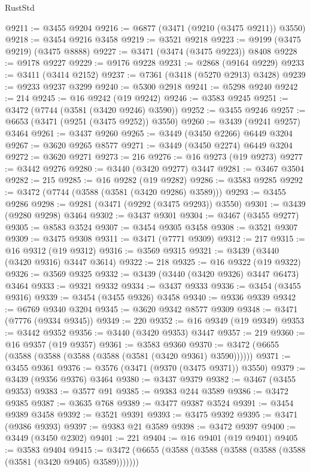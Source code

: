 \begin{lexlean}{RustStd}
\begin{coremodule}
{{{{{{{{{{{{{{{{{{{@9211 := @3455 @9204
@9216 := @6877 (@3471 (@9210 (@3475 @9211)) @3550)
@9218 := @3454 @9216 @3458
@9219 := @3521 @9218
@9223 := @9199 (@3475 @9219) (@3475 @8888)
@9227 := @3471 (@3474 (@3475 @9223)) @8408
@9228 := @9178 @9227
@9229 := @9176 @9228
@9231 := @2868 (@9164 @9229)
@9233 := @3411 (@3414 @2152)
@9237 := @7361 (@3418 (@5270 @2913) @3428)
@9239 := @9233 @9237 @3299
@9240 := @5300 @2918
@9241 := @5298 @9240
@9242 := 214
@9245 := @16 @9242 (@19 @9242)
@9246 := @3583 @9245
@9251 := @3472 (@7744 (@3581 (@3420 @9246) @3590))
@9252 := @3455 @9246
@9257 := @6653 (@3471 (@9251 (@3475 @9252)) @3550)
@9260 := @3439 (@9241 @9257) @3464
@9261 := @3437 @9260
@9265 := @3449 (@3450 @2266) @6449 @3204
@9267 := @3620 @9265 @8577
@9271 := @3449 (@3450 @2274) @6449 @3204
@9272 := @3620 @9271
@9273 := 216
@9276 := @16 @9273 (@19 @9273)
@9277 := @3442 @9276
@9280 := @3440 (@3420 @9277) @3447
@9281 := @3467 @3504
@9282 := 215
@9285 := @16 @9282 (@19 @9282)
@9286 := @3583 @9285
@9292 := @3472 (@7744 (@3588 (@3581 (@3420 @9286) @3589)))
@9293 := @3455 @9286
@9298 := @9281 (@3471 (@9292 (@3475 @9293)) @3550)
@9301 := @3439 (@9280 @9298) @3464
@9302 := @3437 @9301
@9304 := @3467 (@3455 @9277)
@9305 := @8583 @3524
@9307 := @3454 @9305 @3458
@9308 := @3521 @9307
@9309 := @3475 @9308
@9311 := @3471 (@7771 @9309)
@9312 := 217
@9315 := @16 @9312 (@19 @9312)
@9316 := @3569 @9315
@9321 := @3439 (@3440 (@3420 @9316) @3447 @3614)
@9322 := 218
@9325 := @16 @9322 (@19 @9322)
@9326 := @3569 @9325
@9332 := @3439 (@3440 (@3420 @9326) @3447 @6473) @3464
@9333 := @9321 @9332
@9334 := @3437 @9333
@9336 := @3454 (@3455 @9316)
@9339 := @3454 (@3455 @9326) @3458
@9340 := @9336 @9339
@9342 := @6769 @9340 @3204
@9345 := @3620 @9342 @8577 @9309
@9348 := @3471 (@7776 (@9334 @9345))
@9349 := 220
@9352 := @16 @9349 (@19 @9349)
@9353 := @3442 @9352
@9356 := @3440 (@3420 @9353) @3447
@9357 := 219
@9360 := @16 @9357 (@19 @9357)
@9361 := @3583 @9360
@9370 := @3472 (@6655 (@3588 (@3588 (@3588 (@3588 (@3581 (@3420 @9361) @3590))))))
@9371 := @3455 @9361
@9376 := @3576 (@3471 (@9370 (@3475 @9371)) @3550)
@9379 := @3439 (@9356 @9376) @3464
@9380 := @3437 @9379
@9382 := @3467 (@3455 @9353)
@9383 := @3577 @91
@9385 := @9383 @244 @3589
@9386 := @3472 @9385
@9387 := @3635 @768
@9389 := @3477 @9387 @3524
@9391 := @3454 @9389 @3458
@9392 := @3521 @9391
@9393 := @3475 @9392
@9395 := @3471 (@9386 @9393)
@9397 := @9383 @21 @3589
@9398 := @3472 @9397
@9400 := @3449 (@3450 @2302)
@9401 := 221
@9404 := @16 @9401 (@19 @9401)
@9405 := @3583 @9404
@9415 := @3472 (@6655 (@3588 (@3588 (@3588 (@3588 (@3588 (@3581 (@3420 @9405) @3589)))))))
}}}}}}}}}}}}}}}}}}}
\end{coremodule}
\end{lexlean}
